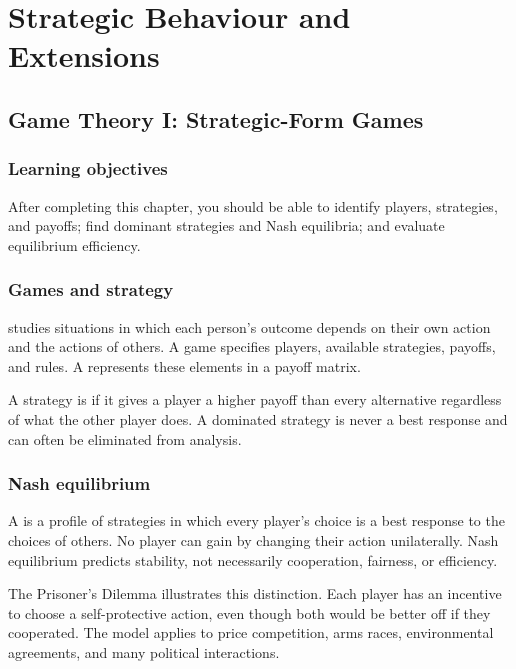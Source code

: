 \part{Strategic Behaviour and Extensions}

\chapter{Game Theory I: Strategic-Form Games}
\label{chap:game-theory-static}

\section{Learning objectives}

After completing this chapter, you should be able to identify players, strategies, and payoffs; find dominant strategies and Nash equilibria; and evaluate equilibrium efficiency.

\section{Games and strategy}

 studies situations in which each person's outcome depends on their own action and the actions of others. A game specifies players, available strategies, payoffs, and rules. A  represents these elements in a payoff matrix.

A strategy is  if it gives a player a higher payoff than every alternative regardless of what the other player does. A dominated strategy is never a best response and can often be eliminated from analysis.

\section{Nash equilibrium}

A  is a profile of strategies in which every player's choice is a best response to the choices of others. No player can gain by changing their action unilaterally. Nash equilibrium predicts stability, not necessarily cooperation, fairness, or efficiency.

The Prisoner's Dilemma illustrates this distinction. Each player has an incentive to choose a self-protective action, even though both would be better off if they cooperated. The model applies to price competition, arms races, environmental agreements, and many political interactions.

